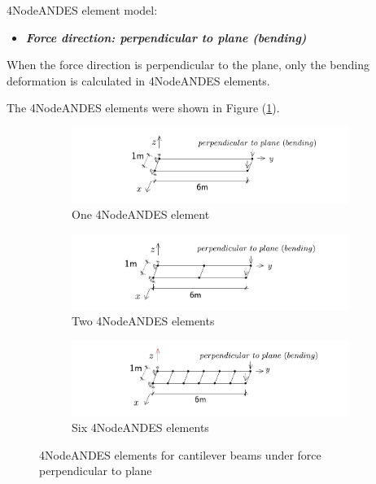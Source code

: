 \documentclass[fleqn,11pt]{article}
\begin{document}
4NodeANDES element model:

\vskip 12pt

\begin{itemize}
  \item \textbf{\emph{Force direction: perpendicular to plane (bending)}}
\end{itemize}
When the force direction is perpendicular to the plane, only the bending deformation is calculated in 4NodeANDES elements. 


The 4NodeANDES elements were shown in Figure (\ref{fig 4NodeANDES elements for cantilever beams under force perpendicular to plane}).

\begin{figure}[H]
  \centering
  \begin{subfigure}{0.5\textwidth}
    \centering
    \includegraphics[width=9cm]{../Figure-files/beam_ANDES_xy_bending_1div.pdf}
    \caption{One 4NodeANDES element}
  \end{subfigure}
  \vskip 8pt
  \begin{subfigure}{0.5\textwidth}
    \centering
    \includegraphics[width=9cm]{../Figure-files/beam_ANDES_xy_bending_2div.pdf}
    \caption{Two 4NodeANDES elements}
  \end{subfigure}
  \vskip 8pt
  \begin{subfigure}{0.5\textwidth}
    \centering
    \includegraphics[width=9cm]{../Figure-files/beam_ANDES_xy_bending_6div.pdf}
    \caption{Six 4NodeANDES elements}
  \end{subfigure}
  \captionsetup{justification=centering,margin=3cm}
  \caption{4NodeANDES elements for cantilever beams under force perpendicular to plane}
  \label{fig 4NodeANDES elements for cantilever beams under force perpendicular to plane}
\end{figure}
\end{document}
